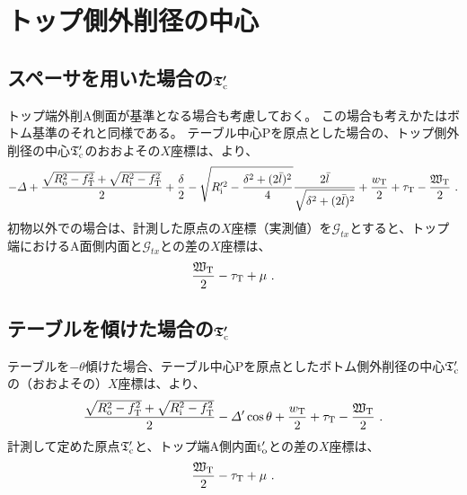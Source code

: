 \clearpage
\section{トップ側外削径の中心}


\subsection[スペーサを用いた場合の\texorpdfstring{$\mathfrak T_\text c'$}{Tc'}]
           {スペーサを用いた場合の$\boldsymbol{\mathfrak T_\text c'}$}
トップ端外削A側面が基準となる場合も考慮しておく。
この場合も考えかたはボトム基準のそれと同様である。
テーブル中心Pを原点とした場合の、トップ側外削径の中心$\mathfrak T_\text c'$のおおよその$X$座標は、より、
\begin{align*}
  -\varDelta+\frac{\sqrt{R_\text o^2-f_\text T^2}+\sqrt{R_\text i^2-f_\text T^2}}2+\frac\delta2
  -\sqrt{R_\text i'^2-\frac{\delta^2+(2\bar l)^2}4}\frac{2\bar l}{\sqrt{\delta^2+(2\bar l)^2}}
  +\frac{w_\text T}2+\tau_\text T-\frac{\mathfrak W_\text T}2\ .
\end{align*}
初物以外での場合は、計測した原点の$X$座標（実測値）を$\mathcal G_{tx}$とすると、トップ端におけるA面側内面と$\mathcal G_{tx}$との差の$X$座標は、
\begin{align*}
  \frac{\mathfrak W_\text T}2-\tau_\text T+\mu~.
\end{align*}


\subsection[テーブルを傾けた場合の\texorpdfstring{$\mathfrak T_\text c'$}{Tc'}]
           {テーブルを傾けた場合の$\boldsymbol{\mathfrak T_\text c'}$}
テーブルを$-\theta$傾けた場合、テーブル中心Pを原点としたボトム側外削径の中心$\mathfrak T_\text c'$の（おおよその）$X$座標は、より、
\begin{align*}
  \frac{\sqrt{R_\text o^2-f_\text T^2}+\sqrt{R_\text i^2-f_\text T^2}}2-\varDelta'\cos\theta
  +\frac{w_\text T}2+\tau_\text T-\frac{\mathfrak W_\text T}2\ .
\end{align*}
計測して定めた原点$\mathfrak T_\text c'$と、トップ端A側内面t$_\text o'$との差の$X$座標は、
\begin{align*}
  \frac{\mathfrak W_\text T}2-\tau_\text T+\mu~.
\end{align*}




